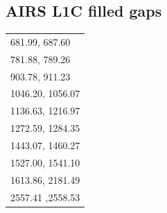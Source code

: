 \documentclass[11pt]{article}
\begin{document}
\subsection{AIRS L1C filled gaps}
\label{sec:orgheadline17}
\begin{center}
\begin{tabular}{l}
681.99,   687.60\\
781.88,   789.26\\
903.78,   911.23\\
1046.20, 1056.07\\
1136.63, 1216.97\\
1272.59, 1284.35\\
1443.07, 1460.27\\
1527.00, 1541.10\\
1613.86, 2181.49\\
2557.41 ,2558.53\\
\end{tabular}
\end{center}
\end{document}

